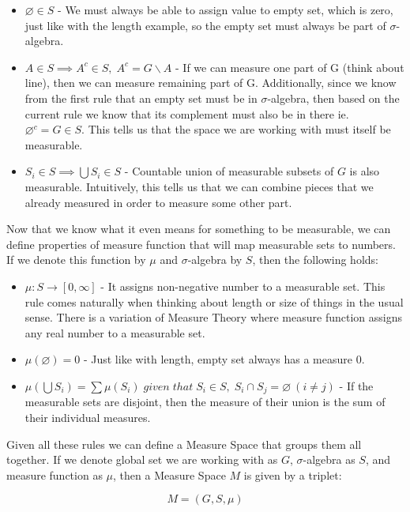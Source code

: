\documentclass{article}
\begin{document}
\begin{itemize}
    \item $\varnothing \in S$ - We must always be able to assign value to empty set, which is zero, just like with the length example, so the empty set must always be part of $\sigma$-algebra.
    \item $A \in S \implies A^c \in S,\;A^c = G \backslash A$ - If we can measure one part of G (think about line), then we can measure remaining part of G. Additionally, since we know from the first rule that an empty set must be in $\sigma$-algebra, then based on the current rule we know that its complement must also be in there ie. $\varnothing^c = G \in S$. This tells us that the space we are working with must itself be measurable.
    \item $S_i \in S \implies \bigcup S_i \in S$ - Countable union of measurable subsets of $G$ is also measurable. Intuitively, this tells us that we can combine pieces that we already measured in order to measure some other part.
\end{itemize}

Now that we know what it even means for something to be measurable, we can define properties of measure function that will map measurable sets to numbers. If we denote this function by $\mu$ and $\sigma$-algebra by $S$, then the following holds:

\begin{itemize}
    \item $\mu: S \rightarrow [0, \infty]$ - It assigns non-negative number to a measurable set. This rule comes naturally when thinking about length or size of things in the usual sense. There is a variation of Measure Theory where measure function assigns any real number to a measurable set.
    \item $\mu(\varnothing) = 0$ - Just like with length, empty set always has a measure 0.
    \item $\mu(\bigcup S_i) = \sum\mu(S_i)\;given\;that\; S_i \in S,\;S_i \cap S_j = \varnothing\:(i \neq j)$ - If the measurable sets are disjoint, then the measure of their union is the sum of their individual measures.
\end{itemize}

Given all these rules we can define a Measure Space that groups them all together. If we denote global set we are working with as $G$, $\sigma$-algebra as $S$, and measure function as $\mu$, then a Measure Space $M$ is given by a triplet:

\[ M = (G, S, \mu)\]
\end{document}
